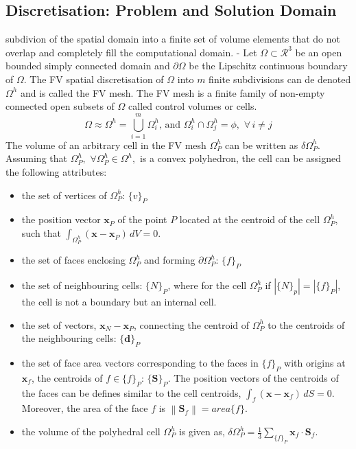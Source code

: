 \subsection{Discretisation: Problem and Solution Domain}
subdivion of the spatial domain into a finite set of volume elements that do not overlap and completely fill the computational domain. 
- Let $\Omega \subset \mathcal{R}^{3}$ be an open bounded simply connected domain and $\partial \Omega$ be the Lipschitz continuous boundary of $\Omega$. 
The FV spatial discretisation of $\Omega$ into $m$ finite subdivisions can de denoted $\Omega^{h}$ and is called the FV mesh.
The FV mesh is a finite family of non-empty connected open subsets of $\Omega$ called control volumes or cells. 
\begin{equation}\label{def_fvmesh}
    \Omega \approx \Omega^{h} = \bigcup_{i=1}^{m} \Omega_{i}^{h},\,\text{and}\,\, \Omega_{i}^{h} \cap \Omega_{j}^{h} = \phi,\,\,\forall\, i \neq j
\end{equation} 
The volume of an arbitrary cell in the FV mesh $\Omega_{P}^{h}$ can be written as $\delta \Omega_{P}^{h}$. Assuming that
$\Omega_{P}^{h},\,\,\forall \Omega_{P}^{h} \in \Omega^{h},$ is a convex polyhedron, the cell can be assigned the following attributes:
\begin{itemize}
    \item the set of vertices of $\Omega_{P}^{h}:\,\{v\}_{P}$
    \item the position vector $\mathbf{x}_{P}$ of the point $P$ located at the centroid of the cell $\Omega_{P}^{h}$, such that $\int_{\Omega_{P}^{h}}(\mathbf{x} - \mathbf{x}_{P})\,dV = 0$.
    \item the set of faces enclosing $\Omega_{P}^{h}$ and forming $\partial\Omega_{P}^{h}:\,\{f\}_{P}$
    \item the set of neighbouring cells: $\{N\}_{P}$, where for the cell $\Omega_{P}^{h}$ if $|\{N\}_{p}| = |\{f\}_{P}|$, the cell is not a boundary but an internal cell.
    \item the set of vectors, $\mathbf{x}_{N} - \mathbf{x}_{P}$, connecting the centroid of $\Omega_{P}^{h}$ to the centroids of the neighbouring cells: $\{\mathbf{d}\}_{P}$
    \item the set of face area vectors corresponding to the faces in $\{f\}_{P}$ with origins at $\mathbf{x}_{f}$, the centroids of $f \in \{f\}_{P}:\,\{\mathbf{S}\}_{P}$. The
        position vectors of the centroids of the faces can be defines similar to the cell centroids, $\int_{f} (\mathbf{x} - \mathbf{x}_{f})\,dS = 0$. Moreover, the area of the 
        face $f$ is $\left\|\mathbf{S}_{f}\right\| = area\{f\}$. 
    \item the volume of the polyhedral cell $\Omega_{P}^{h}$ is given as, $\delta \Omega_{P}^{h} = \frac{1}{3}\sum_{\{f\}_{P}} \mathbf{x}_{f} \cdot \mathbf{S}_{f}$.
\end{itemize}
